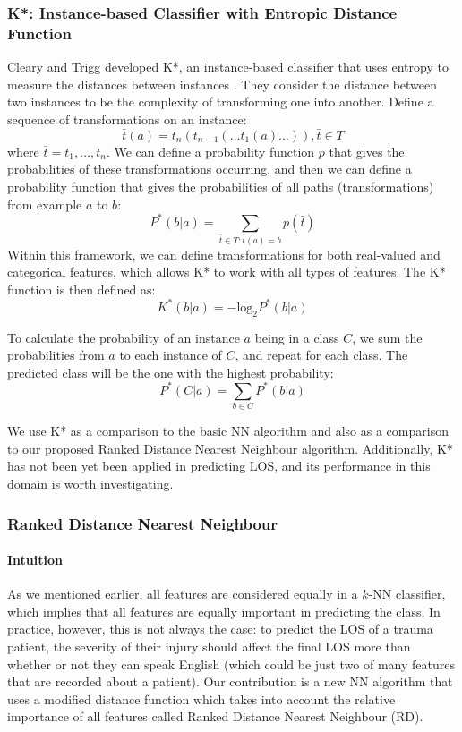 \documentclass{article}
\begin{document}
\subsubsection{K*: Instance-based Classifier with Entropic Distance Function}
Cleary and Trigg developed K*, an instance-based classifier that uses entropy
to measure the distances between instances \cite{Cleary1995}. They consider
the distance between two instances to be the complexity of transforming one
into another. Define a sequence of transformations on an instance:
\begin{equation*}
\bar{t}(a) = t_n(t_{n-1}(\ldots t_1(a)\ldots)), \bar{t} \in T
\end{equation*}
where $\bar{t} = t_1,\ldots,t_n$. We can define a probability function $p$
that gives the probabilities of these transformations occurring, and then we
can define a probability function that gives the probabilities of all paths
(transformations) from example $a$ to $b$:
\begin{equation*}
P^*(b|a) = \sum_{\bar{t}\in T:\bar{t}(a)=b} p(\bar{t})
\end{equation*}
Within this framework, we can define transformations for both real-valued and
categorical features, which allows K* to work with all types of features.
The K* function is then defined as:
\begin{equation*}
K^*(b|a) = -\mathrm{log}_2P^*(b|a)
\end{equation*}

To calculate the probability of an instance $a$ being in a class $C$, we sum
the probabilities from $a$ to each instance of $C$, and repeat for each class.
The predicted class will be the one with the highest probability:
\begin{equation*}
P^*(C|a) = \sum_{b\in C} P^*(b|a)
\end{equation*}

We use K* as a comparison to the basic NN algorithm and also as a comparison
to our proposed Ranked Distance Nearest Neighbour algorithm. Additionally,
K* has not been yet been applied in predicting LOS, and its performance in this
domain is worth investigating.

\subsubsection{Ranked Distance Nearest Neighbour}
\paragraph{Intuition}
As we mentioned earlier, all features are considered equally in a $k$-NN
classifier, which implies that all features are equally important in predicting
the class. In practice, however, this is not always the case: to predict the
LOS of a trauma patient, the severity of their injury should affect the final
LOS more than whether or not they can speak English (which could be just two
of many features that are recorded about a patient). Our contribution is a
new NN algorithm that uses a modified distance function which takes into
account the relative importance of all features called Ranked Distance
Nearest Neighbour (RD).
\end{document}
